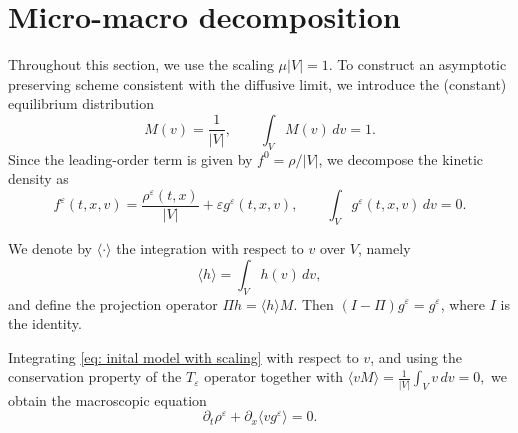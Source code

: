 \documentclass[11pt,twoside]{article}
\numberwithin{equation}{section}
\theoremstyle{plain}
\theoremstyle{nonumberplain}
\begin{document}
{
\section{Micro-macro decomposition}
\label{sec: micro macro decomp}

Throughout this section, we use the scaling $\mu |V|=1$. 
To construct an asymptotic preserving scheme consistent with the diffusive limit, we introduce the (constant) equilibrium distribution 
\[
M(v)=\frac1{|V|},
\qquad \int_V M(v)\,dv=1.
\]
Since the leading-order term is given by \(f^0=\rho/|V|\), we decompose the kinetic density as
\begin{equation}\label{f_expansion}
f^\varepsilon(t,x,v)=\frac{\rho^\varepsilon(t,x)}{|V|}+\varepsilon g^\varepsilon(t,x,v),
\qquad
\int_V g^\varepsilon(t,x,v)\,dv=0.
\end{equation}


We denote by \(\langle \cdot \rangle\) the integration with respect to \(v\) over \(V\), namely
\[
\langle h\rangle = \int_V h(v)\,dv,
\]
and define the projection operator
$
\Pi h = \langle h\rangle M.
$ Then \((I-\Pi)g^\varepsilon=g^\varepsilon\), where $I$ is the identity.

Integrating \eqref{eq: inital model with scaling} with respect to \(v\), and using the conservation property of the $T_\varepsilon$ operator together with
$
\langle vM\rangle = \frac1{|V|}\int_V v\,dv = 0,
$
we obtain the macroscopic equation
\[
\partial_t \rho^\varepsilon + \partial_x \langle v g^\varepsilon\rangle = 0.
\]

}
\end{document}
